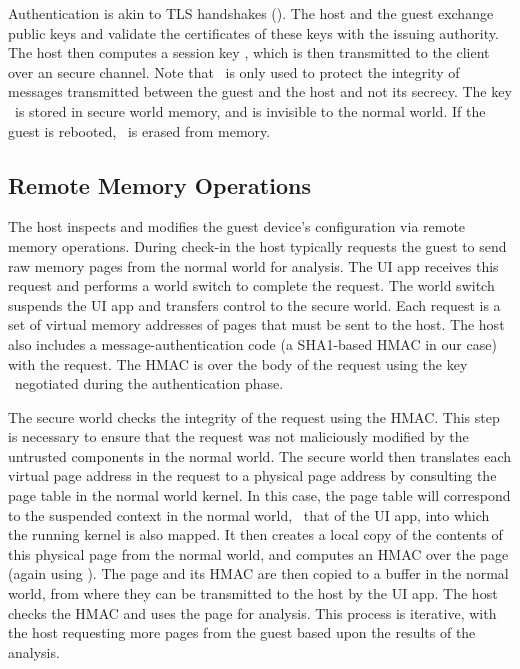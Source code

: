 Authentication is akin to TLS handshakes (). The
host and the guest exchange public keys and validate the certificates of these
keys with the issuing authority. The host then computes a session key \ks,
which is then transmitted to the client over an secure channel. Note that \ks\
is only used to protect the integrity of messages transmitted between the guest
and the host and not its secrecy.  The key \ks\ is stored in secure world
memory, and is invisible to the normal world. If the guest is rebooted, \ks\ is
erased from memory.

\subsection{Remote Memory Operations}
\label{section:mechanism:rmo}

%
The host inspects and modifies the guest device's configuration via remote
memory operations. During check-in the host typically requests the guest to
send raw memory pages from the normal world for analysis.  The UI app receives
this request and performs a world switch to complete the request.  The world
switch suspends the UI app and transfers control to the secure world.  Each
request is a set of virtual memory addresses of pages that must be sent to the
host.   The host also includes a message-authentication code (a SHA1-based HMAC
in our case) with the request. The HMAC is over the body of the request using
the key \ks\ negotiated during the authentication phase.

The secure world checks the integrity of the request using the HMAC. This step
is necessary to ensure that the request was not maliciously modified by the
untrusted components in the normal world. The secure world then translates each
virtual page address in the request to a physical page address by consulting
the page table in the normal world kernel. In this case, the page table will
correspond to the suspended context in the normal world, \ie~that of the UI
app, into which the running kernel is also mapped.  It then creates a
local copy of the contents of this physical page from the normal world, and
computes an HMAC over the page (again using \ks). The page and its HMAC are
then copied to a buffer in the normal world, from where they can be transmitted
to the host by the UI app.  The host checks the HMAC and uses the page for
analysis. This process is iterative, with the host requesting more pages from
the guest based upon the results of the analysis.

